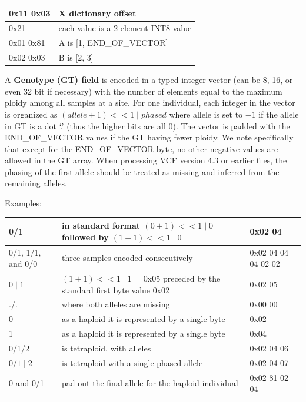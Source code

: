 \documentclass[8pt]{article}
\begin{document}
\vspace{0.3cm}
\begin{tabular}{|p{2cm} | l |} \hline
0x11 0x03 & X dictionary offset \\ \hline
0x21 & each value is a 2 element INT8 value \\ \hline
0x01 0x81 & A is [1, END\_OF\_VECTOR] \\ \hline
0x02 0x03 & B is [2, 3] \\ \hline
\end{tabular}
\vspace{0.3cm}


\vspace{0.3cm}
A \textbf{Genotype (GT) field} is encoded in a typed integer vector (can be 8, 16, or even 32 bit if necessary) with the number of elements equal to the maximum ploidy among all samples at a site.
For one individual, each integer in the vector is organized as $(allele+1) << 1 \mid phased$ where allele is set to $-1$ if the allele in GT is a dot `.' (thus the higher bits are all 0).
The vector is padded with the END\_OF\_VECTOR values if the GT having fewer ploidy.
We note specifically that except for the END\_OF\_VECTOR byte, no other negative values are allowed in the GT array.
When processing VCF version 4.3 or earlier files, the phasing of the first allele should be treated as missing and inferred from the remaining alleles.

Examples:

\vspace{0.3cm}
\small
\begin{tabular}{|p{2.5cm} | p{10cm} | p{3cm}|} \hline
0/1 & in standard format $(0 + 1) << 1 \mid 0$ followed by $(1 + 1) << 1 \mid 0$ & 0x02 04 \\ \hline
0/1, 1/1, and 0/0 & three samples encoded consecutively & 0x02 04 04 04 02 02 \\ \hline
$0\mid1$ & $(1 + 1) << 1 \mid 1$ = 0x05 preceded by the standard first byte value 0x02 & 0x02 05 \\ \hline
./. & where both alleles are missing & 0x00 00 \\ \hline
0 & as a haploid it is represented by a single byte & 0x02 \\ \hline
1 & as a haploid it is represented by a single byte & 0x04 \\ \hline
0/1/2 & is tetraploid, with alleles & 0x02 04 06 \\ \hline
$0/1\mid2$ & is tetraploid with a single phased allele & 0x02 04 07 \\ \hline
0 and 0/1 & pad out the final allele for the haploid individual & 0x02 81 02 04\\ \hline
\end{tabular}
\normalsize
\end{document}
